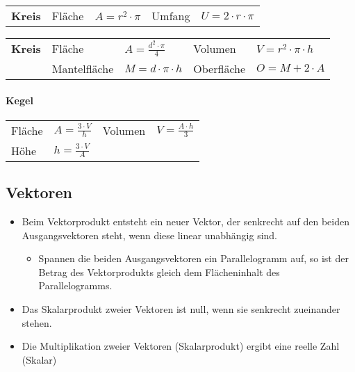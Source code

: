 \begin{tabbing}
	\begin{tabu} to \linewidth {l l X l X}
		\textbf{Kreis} & Fläche & $A = r^2 \cdot \pi$ & 
		Umfang & $U = 2 \cdot r \cdot \pi$ \\
	\end{tabu}
\end{tabbing}


\begin{tabbing}
	\begin{tabu} to \linewidth {l l X l X}
		\textbf{Kreis} &  Fläche & $A = \frac{d^2 \cdot \pi}{4}$ &
		Volumen & $V = r^2 \cdot \pi \cdot h $ \\
		& Mantelfläche & $M = d \cdot \pi \cdot h$ &
		Oberfläche & $O = M + 2 \cdot A $ \\
		\bottomrule
	\end{tabu}
\end{tabbing}

\paragraph{Kegel}
\begin{tabbing}
	\begin{tabu} to \linewidth {l X l X}
		\toprule
		Fläche & $A = \frac{3 \cdot V}{h}$ &
		Volumen & $V = \frac{A \cdot h}{3}$ \\
		Höhe & $h = \frac{3 \cdot V}{A}$ & & \\
		\bottomrule
	\end{tabu}
\end{tabbing}

\subsection{Vektoren}

\begin{itemize}
	\item Beim Vektorprodukt entsteht ein neuer Vektor, der senkrecht auf den beiden Ausgangsvektoren steht, wenn diese linear unabhängig sind.
	\begin{itemize}
		\item Spannen die beiden Ausgangsvektoren ein Parallelogramm auf, so ist der Betrag des Vektorprodukts gleich dem Flächeninhalt des Parallelogramms.
	\end{itemize}
	\item Das Skalarprodukt zweier Vektoren ist null, wenn sie senkrecht zueinander stehen.
	\item Die Multiplikation zweier Vektoren (Skalarprodukt) ergibt eine reelle Zahl (Skalar)
\end{itemize}

